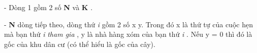 - Dòng 1 gồm 2 số \textbf{ N } và \textbf{ K } .

- \textbf{ N } dòng tiếp theo, dòng thứ \emph{ i } gồm 2 số x y. Trong đó x là thứ tự của cuộc hẹn mà bạn thứ \emph{ i }\emph{ tham gia } , y là nhà hàng xóm của bạn thứ \emph{ i } . Nếu y = 0 thì đó là gốc của khu dân cư (có thể hiểu là gốc của cây).